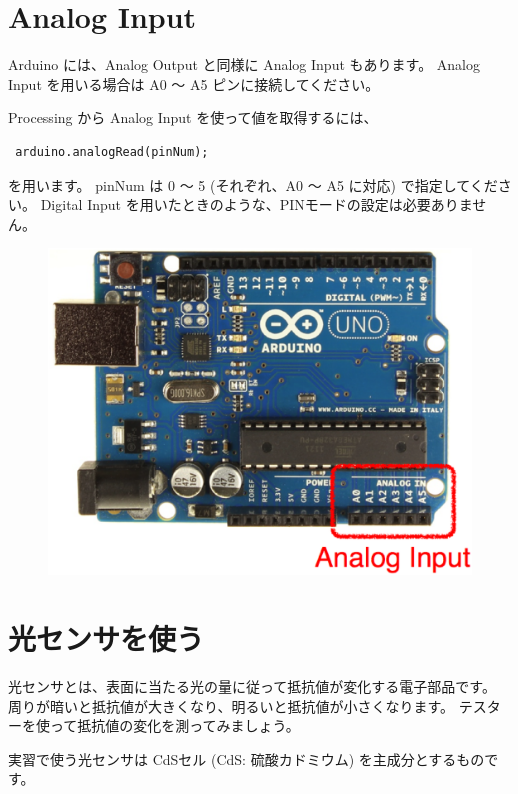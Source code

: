 \documentclass[11pt,a4paper]{jarticle}
\begin{document}
\newpage

\section{Analog Input}
Arduino には、Analog Output と同様に Analog Input もあります。
Analog Input を用いる場合は A0 〜 A5 ピンに接続してください。

Processing から Analog Input を使って値を取得するには、
\begin{lstlisting}
 arduino.analogRead(pinNum);
\end{lstlisting}
を用います。
pinNum は 0 〜 5 (それぞれ、A0 〜 A5 に対応) で指定してください。
Digital Input を用いたときのような、PINモードの設定は必要ありません。

\begin{figure}[h!]
 \centering
 \includegraphics[width=0.6\columnwidth]{img/analog_input_pins.eps}
\end{figure}

\section{光センサを使う}
光センサとは、表面に当たる光の量に従って抵抗値が変化する電子部品です。
周りが暗いと抵抗値が大きくなり、明るいと抵抗値が小さくなります。
テスターを使って抵抗値の変化を測ってみましょう。

実習で使う光センサは CdSセル (CdS: 硫酸カドミウム) を主成分とするものです。
\end{document}
